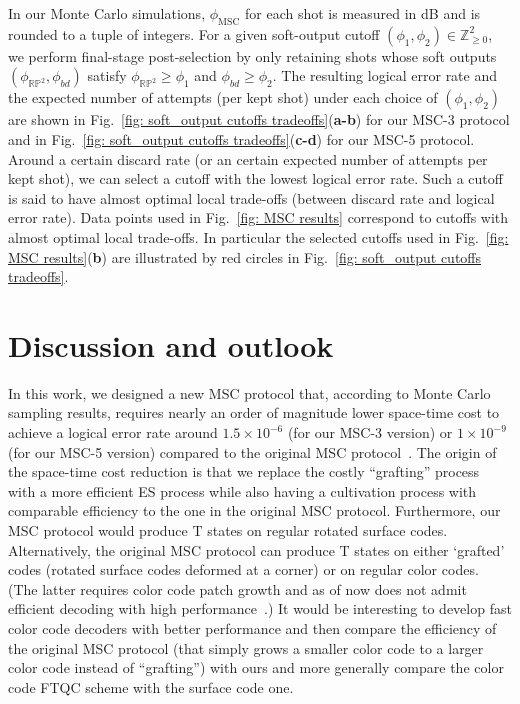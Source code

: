 \documentclass[reprint,aps,twocolumn,superscriptaddress,showpacs,notitlepage,10pt]{revtex4-2}
\theoremstyle{definition}
\begin{document}
In our Monte Carlo simulations, $\phi_{\mathrm{MSC}}$ for each shot is measured in dB and is rounded to a tuple of integers. For a given soft-output cutoff $(\phi_1,\phi_2)\in\mathbb{Z}_{\geq0}^2$, we perform final-stage post-selection by only retaining shots whose soft outputs $(\phi_{\mathbb{RP}^2},\phi_{bd})$ satisfy $\phi_{\mathbb{RP}^2}\geq \phi_1$ and $\phi_{bd}\geq \phi_2$. The resulting logical error rate and the expected number of attempts (per kept shot) under each choice of $(\phi_1,\phi_2)$ are shown in Fig.~\ref{fig: soft_output cutoffs tradeoffs}(\textbf{a-b}) for our MSC-3 protocol and in Fig.~\ref{fig: soft_output cutoffs tradeoffs}(\textbf{c-d}) for our MSC-5 protocol. Around a certain discard rate (or an certain expected number of attempts per kept shot), we can select a cutoff with the lowest logical error rate. Such a cutoff is said to have almost optimal local trade-offs (between discard rate and logical error rate). Data points used in Fig.~\ref{fig: MSC results} correspond to cutoffs with almost optimal local trade-offs.  In particular the selected cutoffs used in Fig.~\ref{fig: MSC results}(\textbf{b}) are illustrated by red circles in Fig.~\ref{fig: soft_output cutoffs tradeoffs}.  



\section{Discussion and outlook}\label{sec: discussion and outlook}

In this work, we designed a new MSC protocol that, according to Monte Carlo sampling results, requires nearly an order of magnitude lower space-time cost to achieve a logical error rate around $1.5\times 10^{-6}$ (for our MSC-3 version) or $1\times 10^{-9}$ (for our MSC-5 version) compared to the original MSC protocol~\cite{gidney_magic_2024}. The origin of the space-time cost reduction is that we replace the costly ``grafting'' process~\cite{gidney_magic_2024} with a more efficient ES process while also having a cultivation process with comparable efficiency to the one in the original MSC protocol. Furthermore, our MSC protocol would produce $\mathrm{T}$ states on regular rotated surface codes. Alternatively, the original MSC protocol can produce $\mathrm{T}$ states on either `grafted' codes (rotated surface codes deformed at a corner) or on regular color codes. (The latter requires color code patch growth and as of now does not admit efficient decoding with high performance~\cite{gidney_magic_2024}.) It would be interesting to develop fast color code decoders with better performance and then compare the efficiency of the original MSC protocol (that simply grows a smaller color code to a larger color code instead of ``grafting'') with ours and more generally compare the color code FTQC scheme with the surface code one.   
\end{document}
